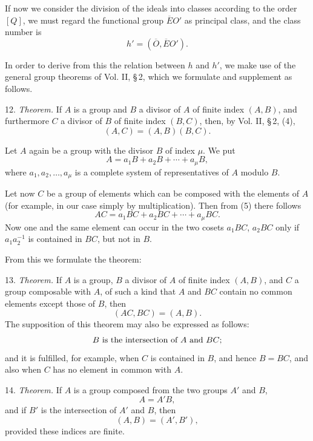 \documentclass[11pt]{article}
\begin{document}
If now we consider the division of the ideals into classes according to the order \([Q]\), we must regard the functional group \(\overline EO'\) as principal class, and the class number is
\begin{equation}
 h'=(\overline O,\overline EO').
\tag{3}
\end{equation}

In order to derive from this the relation between \(h\) and \(h'\), we make use of the general group theorems of Vol. II, \S\,2, which we formulate and supplement as follows.

12. \emph{Theorem.} If \(A\) is a group and \(B\) a divisor of \(A\) of finite index \((A,B)\), and furthermore \(C\) a divisor of \(B\) of finite index \((B,C)\), then, by Vol. II, \S\,2, (4),
\begin{equation}
 (A,C)=(A,B)(B,C).
\tag{4}
\end{equation}

Let \(A\) again be a group with the divisor \(B\) of index \(\mu\). We put
\begin{equation}
 A=a_1B+a_2B+\cdots+a_\mu B,
\tag{5}
\end{equation}
where \(a_1,a_2,\ldots,a_\mu\) is a complete system of representatives of \(A\) modulo \(B\).

Let now \(C\) be a group of elements which can be composed with the elements of \(A\) (for example, in our case simply by multiplication). Then from (5) there follows
\begin{equation}
 AC=a_1BC+a_2BC+\cdots+a_\mu BC.
\tag{6}
\end{equation}
Now one and the same element can occur in the two cosets \(a_1BC\), \(a_2BC\) only if \(a_1a_2^{-1}\) is contained in \(BC\), but not in \(B\).

From this we formulate the theorem:

13. \emph{Theorem.} If \(A\) is a group, \(B\) a divisor of \(A\) of finite index \((A,B)\), and \(C\) a group composable with \(A\), of such a kind that \(A\) and \(BC\) contain no common elements except those of \(B\), then
\begin{equation}
 (AC,BC)=(A,B).
\tag{7}
\end{equation}
The supposition of this theorem may also be expressed as follows:
\[
 B\hbox{ is the intersection of }A\hbox{ and }BC;
\]
and it is fulfilled, for example, when \(C\) is contained in \(B\), and hence \(B=BC\), and also when \(C\) has no element in common with \(A\).

14. \emph{Theorem.} If \(A\) is a group composed from the two groups \(A'\) and \(B\),
\begin{equation}
 A=A'B,
\tag{8}
\end{equation}
and if \(B'\) is the intersection of \(A'\) and \(B\), then
\begin{equation}
 (A,B)=(A',B'),
\tag{9}
\end{equation}
provided these indices are finite.
\end{document}
